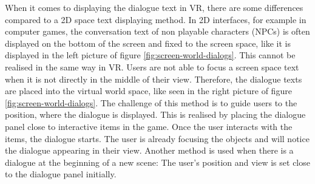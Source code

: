 When it comes to displaying the dialogue text in VR, there are some differences compared to a 2D space text displaying method. In 2D interfaces, for example in computer games, the conversation text of non playable characters (NPCs) is often displayed on the bottom of the screen and fixed to the screen space, like it is displayed in the left picture of figure \ref{fig:screen-world-dialogs}. This cannot be realised in the same way in VR. Users are not able to focus a screen space text when it is not directly in the middle of their view. Therefore, the dialogue texts are placed into the virtual world space, like seen in the right picture of figure \ref{fig:screen-world-dialogs}. The challenge of this method is to guide users to the position, where the dialogue is displayed. This is realised by placing the dialogue panel close to interactive items in the game. Once the user interacts with the items, the dialogue starts. The user is already focusing the objects and will notice the dialogue appearing in their view. Another method is used when there is a dialogue at the beginning of a new scene: The user's position and view is set close to the dialogue panel initially.
